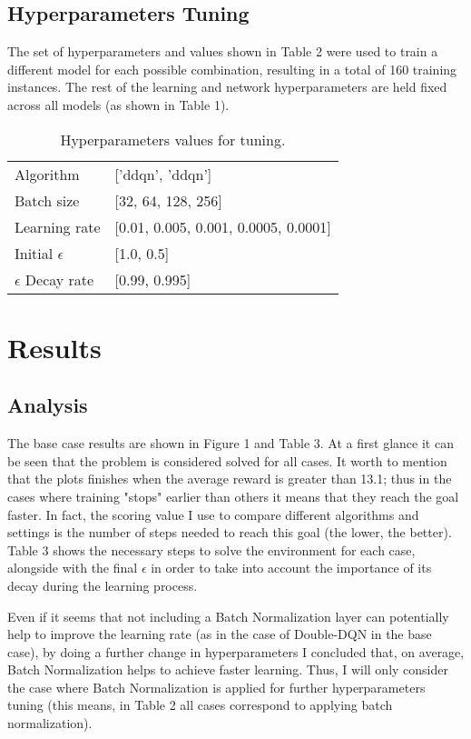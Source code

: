 \documentclass{article}
\begin{document}
\subsection{Hyperparameters Tuning}

The set of hyperparameters and values shown in Table 2 were used to train a different model for each possible combination, resulting in a total of 160 training instances. The rest of the learning and network hyperparameters are held fixed across all models (as shown in Table 1). 

\begin{table}[h!]
\centering
\begin{tabular}{ll}
\toprule
\midrule
Algorithm  &  ['ddqn', 'ddqn'] \\
Batch size &  [32, 64, 128, 256] \\
Learning rate &  [0.01, 0.005, 0.001, 0.0005, 0.0001] \\
Initial $\epsilon$ &  [1.0, 0.5] \\
$\epsilon$ Decay rate &  [0.99, 0.995] \\
\bottomrule
\end{tabular}
\label{table:hyperp}
\caption{Hyperparameters values for tuning.}
\end{table}

\section{Results}

\subsection{Analysis}

The base case results are shown in Figure 1 and Table 3. At a first glance it can be seen that the problem is considered solved for all cases. It worth to mention that the plots finishes when the average reward is greater than 13.1; thus in the cases where training "stops" earlier than others it means that they reach the goal faster. In fact, the scoring value I use to compare different algorithms and settings is the number of steps needed to reach this goal (the lower, the better). Table 3 shows the necessary steps to solve the environment for each case, alongside with the final $\epsilon$ in order to take into account the importance of its decay during the learning process.

Even if it seems that not including a Batch Normalization layer can potentially help to improve the learning rate (as in the case of Double-DQN in the base case), by doing a further change in hyperparameters I concluded that, on average, Batch Normalization helps to achieve faster learning. Thus, I will only consider the case where Batch Normalization is applied for further hyperparameters tuning (this means, in Table 2 all cases correspond to applying batch normalization).
\end{document}
